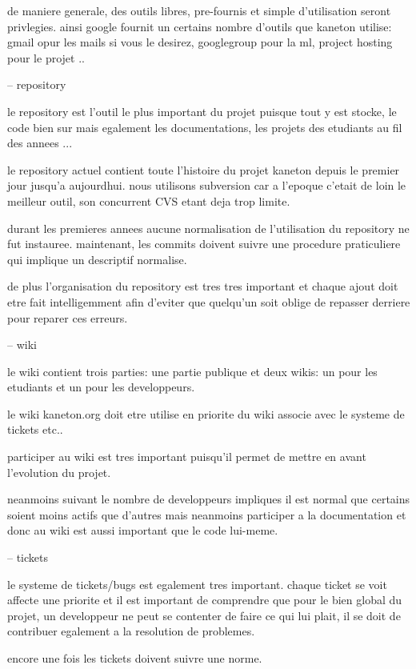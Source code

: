 de maniere generale, des outils libres, pre-fournis et simple d'utilisation
seront privlegies. ainsi google fournit un certains nombre d'outils que
kaneton utilise: gmail opur les mails si vous le desirez, googlegroup pour
la ml, project hosting pour le projet ..

-- repository

le repository est l'outil le plus important du projet puisque tout y
est stocke, le code bien sur mais egalement les documentations, les
projets des etudiants au fil des annees ...

le repository actuel contient toute l'histoire du projet kaneton depuis
le premier jour jusqu'a aujourdhui. nous utilisons subversion car a l'epoque
c'etait de loin le meilleur outil, son concurrent CVS etant deja trop
limite.

durant les premieres annees aucune normalisation de l'utilisation du
repository ne fut instauree. maintenant, les commits doivent suivre une
procedure praticuliere qui implique un descriptif normalise.

de plus l'organisation du repository est tres tres important et chaque ajout
doit etre fait intelligemment afin d'eviter que quelqu'un soit oblige de
repasser derriere pour reparer ces erreurs.

-- wiki

le wiki contient trois parties: une partie publique et deux wikis: un pour
les etudiants et un pour les developpeurs.

le wiki kaneton.org doit etre utilise en priorite du wiki associe avec
le systeme de tickets etc..

participer au wiki est tres important puisqu'il permet de mettre en avant
l'evolution du projet.

neanmoins suivant le nombre de developpeurs impliques il est normal que
certains soient moins actifs que d'autres mais neanmoins participer a
la documentation et donc au wiki est aussi important que le code lui-meme.

-- tickets

le systeme de tickets/bugs est egalement tres important. chaque ticket se
voit affecte une priorite et il est important de comprendre que pour le
bien global du projet, un developpeur ne peut se contenter de faire ce
qui lui plait, il se doit de contribuer egalement a la resolution de problemes.

encore une fois les tickets doivent suivre une norme.

%
%

